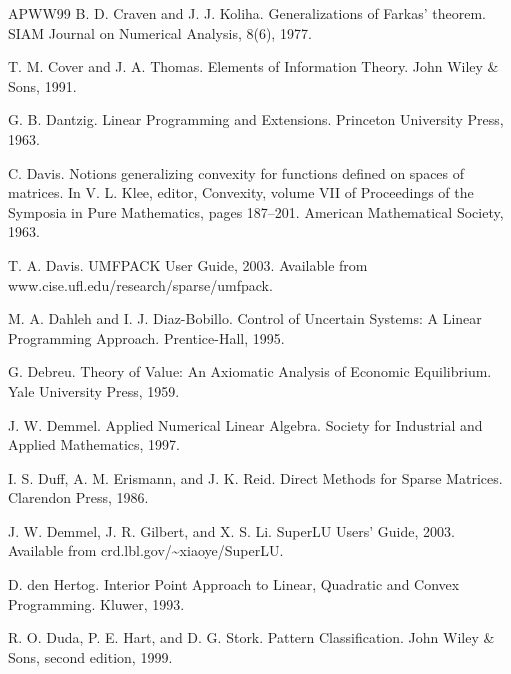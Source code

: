 \begin{thebibliography}{APWW99}
 B. D. Craven and J. J. Koliha. Generalizations of Farkas’ theorem. SIAM Journal on Numerical Analysis, 8(6), 1977.

 T. M. Cover and J. A. Thomas. Elements of Information Theory. John Wiley \& Sons, 1991.

 G. B. Dantzig. Linear Programming and Extensions. Princeton University Press, 1963.

 C. Davis. Notions generalizing convexity for functions defined on spaces of matrices. In V. L. Klee, editor, Convexity, volume VII of Proceedings of the Symposia in Pure Mathematics, pages 187–201. American Mathematical Society, 1963.

 T. A. Davis. UMFPACK User Guide, 2003. Available from www.cise.ufl.edu/research/sparse/umfpack.

 M. A. Dahleh and I. J. Diaz-Bobillo. Control of Uncertain Systems: A Linear Programming Approach. Prentice-Hall, 1995.

 G. Debreu. Theory of Value: An Axiomatic Analysis of Economic Equilibrium. Yale University Press, 1959.

 J. W. Demmel. Applied Numerical Linear Algebra. Society for Industrial and Applied Mathematics, 1997.

 I. S. Duff, A. M. Erismann, and J. K. Reid. Direct Methods for Sparse Matrices. Clarendon Press, 1986.

 J. W. Demmel, J. R. Gilbert, and X. S. Li. SuperLU Users’ Guide, 2003. Available from crd.lbl.gov/\textasciitilde{}xiaoye/SuperLU.

 D. den Hertog. Interior Point Approach to Linear, Quadratic and Convex Programming. Kluwer, 1993.

 R. O. Duda, P. E. Hart, and D. G. Stork. Pattern Classification. John Wiley \& Sons, second edition, 1999.


\end{thebibliography}
